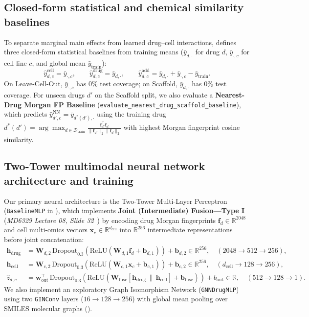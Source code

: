 \documentclass{article}
\begin{document}
\subsection{Closed-form statistical and chemical similarity baselines}
To separate marginal main effects from learned drug--cell interactions,  defines three closed-form statistical baselines from training means ($\bar{y}_{d,\cdot}$ for drug $d$, $\bar{y}_{\cdot,c}$ for cell line $c$, and global mean $\bar{y}_{\text{train}}$):
\begin{equation}
  \hat{y}^{\text{cell}}_{d,c} = \bar{y}_{\cdot,c}, \qquad
  \hat{y}^{\text{drug}}_{d,c} = \bar{y}_{d,\cdot}, \qquad
  \hat{y}^{\text{add}}_{d,c} = \bar{y}_{d,\cdot} + \bar{y}_{\cdot,c} - \bar{y}_{\text{train}}.
  \label{eq:additive}
\end{equation}
On Leave-Cell-Out, $\bar{y}_{\cdot,c}$ has $0\%$ test coverage; on Scaffold, $\bar{y}_{d,\cdot}$ has $0\%$ test coverage. For unseen drugs $d'$ on the Scaffold split, we also evaluate a \textbf{Nearest-Drug Morgan FP Baseline} (\texttt{evaluate\_nearest\_drug\_scaffold\_baseline}), which predicts $\hat{y}^{\text{NN}}_{d',c} = \bar{y}_{d^*(d'),\cdot}$ using the training drug $d^*(d') = \arg\max_{d \in \mathcal{D}_{\text{train}}} \frac{\mathbf{f}_{d'}^\top \mathbf{f}_d}{\|\mathbf{f}_{d'}\|_2 \|\mathbf{f}_d\|_2}$ with highest Morgan fingerprint cosine similarity.

\subsection{Two-Tower multimodal neural network architecture and training}
Our primary neural architecture is the Two-Tower Multi-Layer Perceptron (\texttt{BaselineMLP} in ), which implements \textbf{Joint (Intermediate) Fusion---Type I} (\emph{MD6329 Lecture 08, Slide 32}~\cite{huang2020fusion}) by encoding drug Morgan fingerprints $\mathbf{f}_d \in \mathbb{R}^{2048}$ and cell multi-omics vectors $\mathbf{x}_c \in \mathbb{R}^{d_{\text{cell}}}$ into $\mathbb{R}^{256}$ intermediate representations before joint concatenation:
\begin{align}
  \mathbf{h}_{\text{drug}} &= \mathbf{W}_{d,2}\,\text{Dropout}_{0.3}\!\left(\text{ReLU}(\mathbf{W}_{d,1}\mathbf{f}_d + \mathbf{b}_{d,1})\right) + \mathbf{b}_{d,2} \in \mathbb{R}^{256}, \quad (2048 \to 512 \to 256), \\
  \mathbf{h}_{\text{cell}} &= \mathbf{W}_{c,2}\,\text{Dropout}_{0.3}\!\left(\text{ReLU}(\mathbf{W}_{c,1}\mathbf{x}_c + \mathbf{b}_{c,1})\right) + \mathbf{b}_{c,2} \in \mathbb{R}^{256}, \quad (d_{\text{cell}} \to 128 \to 256), \\
  \hat{z}_{d,c} &= \mathbf{w}_{\text{out}}^\top\,\text{Dropout}_{0.3}\!\left(\text{ReLU}\!\left(\mathbf{W}_{\text{fuse}}[\mathbf{h}_{\text{drug}} \,\|\, \mathbf{h}_{\text{cell}}] + \mathbf{b}_{\text{fuse}}\right)\right) + b_{\text{out}} \in \mathbb{R}, \quad (512 \to 128 \to 1).
\end{align}
We also implement an exploratory Graph Isomorphism Network (\texttt{GNNDrugMLP}) using two \texttt{GINConv} layers ($16 \to 128 \to 256$) with global mean pooling over SMILES molecular graphs ().
\end{document}
